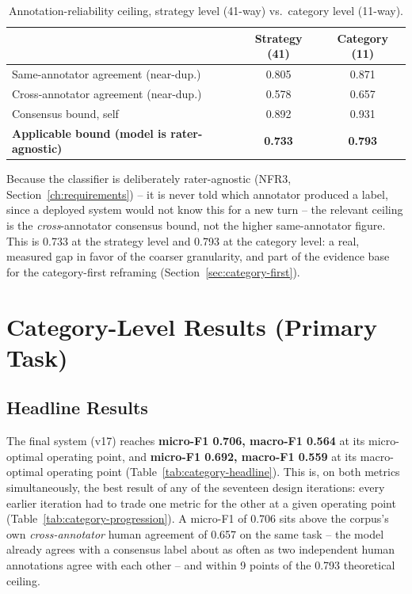 \begin{table}[H]
\centering
\caption{Annotation-reliability ceiling, strategy level (41-way) vs.\ category level (11-way).}
\label{tab:ceiling}
\begin{tabular}{@{}lcc@{}}
\toprule
& \textbf{Strategy (41)} & \textbf{Category (11)} \\
\midrule
Same-annotator agreement (near-dup.) & 0.805 & 0.871 \\
Cross-annotator agreement (near-dup.) & 0.578 & 0.657 \\
Consensus bound, self & 0.892 & 0.931 \\
\textbf{Applicable bound (model is rater-agnostic)} & \textbf{0.733} & \textbf{0.793} \\
\bottomrule
\end{tabular}
\end{table}

Because the classifier is deliberately rater-agnostic (NFR3,
Section~\ref{ch:requirements}) -- it is never told which annotator produced a
label, since a deployed system would not know this for a new turn -- the
relevant ceiling is the \emph{cross}-annotator consensus bound, not the
higher same-annotator figure. This is 0.733 at the strategy level and 0.793
at the category level: a real, measured gap in favor of the coarser
granularity, and part of the evidence base for the category-first reframing
(Section~\ref{sec:category-first}).

\section{Category-Level Results (Primary Task)}
\label{sec:category-results}

\subsection{Headline Results}

The final system (v17) reaches \textbf{micro-F1 0.706, macro-F1 0.564} at
its micro-optimal operating point, and \textbf{micro-F1 0.692, macro-F1
0.559} at its macro-optimal operating point (Table~\ref{tab:category-headline}).
This is, on both metrics simultaneously, the best result of any of the
seventeen design iterations: every earlier iteration had to trade one metric
for the other at a given operating point (Table~\ref{tab:category-progression}).
A micro-F1 of 0.706 sits above the corpus's own \emph{cross-annotator} human
agreement of 0.657 on the same task -- the model already agrees with a
consensus label about as often as two independent human annotations agree
with each other -- and within 9 points of the 0.793 theoretical ceiling.

